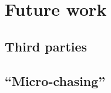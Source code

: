 \section{Future work}
\label{sec:future}

\subsection{Third parties}


\subsection{``Micro-chasing''}
